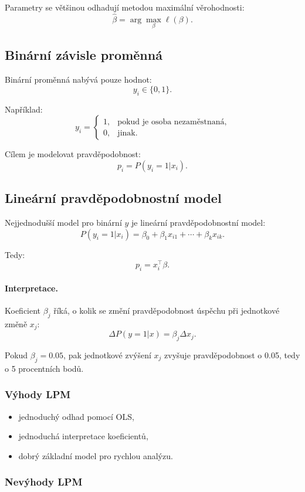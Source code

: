 Parametry se většinou odhadují metodou maximální věrohodnosti:
\[
\hat\beta = \arg\max_{\beta}\ell(\beta).
\]

\subsection{Binární závisle proměnná}

Binární proměnná nabývá pouze hodnot:
\[
y_i\in\{0,1\}.
\]

Například:
\[
y_i=
\begin{cases}
1, & \text{pokud je osoba nezaměstnaná},\\
0, & \text{jinak}.
\end{cases}
\]

Cílem je modelovat pravděpodobnost:
\[
p_i=P(y_i=1|x_i).
\]

\subsection{Lineární pravděpodobnostní model}

Nejjednodušší model pro binární $y$ je lineární pravděpodobnostní model:
\[
P(y_i=1|x_i)=\beta_0+\beta_1x_{i1}+\cdots+\beta_kx_{ik}.
\]

Tedy:
\[
p_i=x_i^\top\beta.
\]

\paragraph{Interpretace.}
Koeficient $\beta_j$ říká, o kolik se změní pravděpodobnost úspěchu při jednotkové změně $x_j$:
\[
\Delta P(y=1|x)=\beta_j\Delta x_j.
\]

Pokud $\beta_j=0.05$, pak jednotkové zvýšení $x_j$ zvyšuje pravděpodobnost o 0.05, tedy o 5 procentních
bodů.

\subsubsection{Výhody LPM}

\begin{itemize}
    \item jednoduchý odhad pomocí OLS,
    \item jednoduchá interpretace koeficientů,
    \item dobrý základní model pro rychlou analýzu.
\end{itemize}

\subsubsection{Nevýhody LPM}

